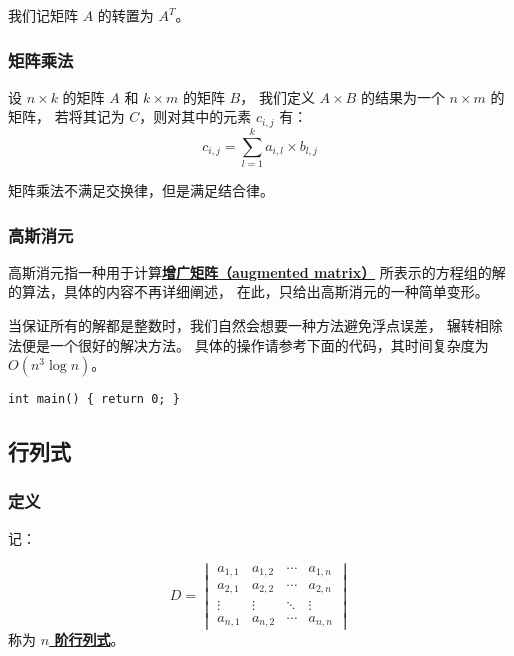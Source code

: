 \documentclass[UTF8]{article}
\begin{document}
	我们记矩阵 $A$ 的转置为 $A^T$。

	\subsubsection{矩阵乘法}

	设 $n \times k$ 的矩阵 $A$ 和 $k \times m$ 的矩阵 $B$，
	我们定义 $A \times B$ 的结果为一个 $n \times m$ 的矩阵，
	若将其记为 $C$，则对其中的元素 $c_{i, j}$ 有：
	$$
	c_{i, j} = \sum_{l = 1}^{k} a_{i, l} \times b_{l, j}
	$$

	矩阵乘法不满足交换律，但是满足结合律。

	\subsubsection{高斯消元}

	高斯消元指一种用于计算\textbf{\uline{增广矩阵（augmented matrix）}}
	所表示的方程组的解的算法，具体的内容不再详细阐述，
	在此，只给出高斯消元的一种简单变形。

	\bigskip


	当保证所有的解都是整数时，我们自然会想要一种方法避免浮点误差，
	辗转相除法便是一个很好的解决方法。
	具体的操作请参考下面的代码，其时间复杂度为 $O(n^3 \log n)$。

	\lstset{language=C++}
	\begin{lstlisting}
int main() { return 0; }
	\end{lstlisting}

	\subsection{行列式}

	\subsubsection{定义}

	记：

	\begin{equation*}
		D =
		\begin{vmatrix}
			a_{1, 1} & a_{1, 2} & \cdots & a_{1, n}
			\\
			a_{2, 1} & a_{2, 2} & \cdots & a_{2, n}
			\\
			\vdots & \vdots & \ddots & \vdots
			\\
			a_{n, 1} & a_{n, 2} & \cdots & a_{n, n}
		\end{vmatrix}
	\end{equation*}
	称为 \textbf{\uline{$n$ 阶行列式}}。
\end{document}
